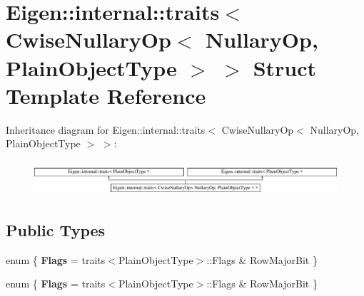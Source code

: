\hypertarget{struct_eigen_1_1internal_1_1traits_3_01_cwise_nullary_op_3_01_nullary_op_00_01_plain_object_type_01_4_01_4}{}\section{Eigen\+:\+:internal\+:\+:traits$<$ Cwise\+Nullary\+Op$<$ Nullary\+Op, Plain\+Object\+Type $>$ $>$ Struct Template Reference}
\label{struct_eigen_1_1internal_1_1traits_3_01_cwise_nullary_op_3_01_nullary_op_00_01_plain_object_type_01_4_01_4}
Inheritance diagram for Eigen\+:\+:internal\+:\+:traits$<$ Cwise\+Nullary\+Op$<$ Nullary\+Op, Plain\+Object\+Type $>$ $>$\+:\begin{figure}[H]
\begin{center}
\leavevmode
\includegraphics[height=1.293303cm]{struct_eigen_1_1internal_1_1traits_3_01_cwise_nullary_op_3_01_nullary_op_00_01_plain_object_type_01_4_01_4}
\end{center}
\end{figure}
\subsection*{Public Types}
\begin{DoxyCompactItemize}
\item 
\mbox{\label{struct_eigen_1_1internal_1_1traits_3_01_cwise_nullary_op_3_01_nullary_op_00_01_plain_object_type_01_4_01_4_ad6c04f7f6024b2ea242b7692a5f11e95}} 
enum \{ {\bfseries Flags} = traits$<$Plain\+Object\+Type$>$\+:\+:Flags \& Row\+Major\+Bit
 \}
\item 
\mbox{\label{struct_eigen_1_1internal_1_1traits_3_01_cwise_nullary_op_3_01_nullary_op_00_01_plain_object_type_01_4_01_4_a7fe3777421f1d144271a4ea4577a042c}} 
enum \{ {\bfseries Flags} = traits$<$Plain\+Object\+Type$>$\+:\+:Flags \& Row\+Major\+Bit
 \}
\end{DoxyCompactItemize}


